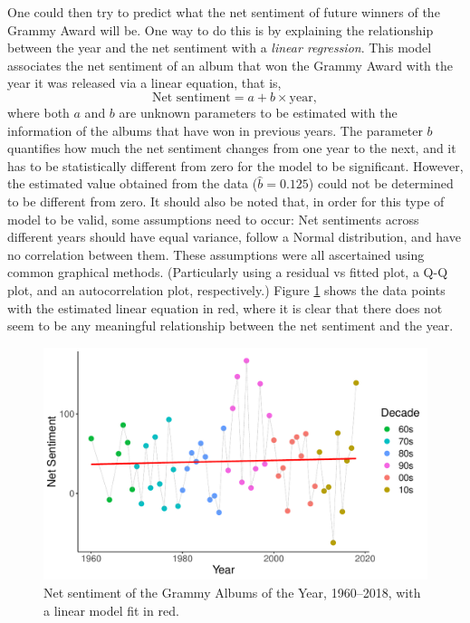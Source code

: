 \documentclass{article}
\begin{document}
One could then try to predict what the net sentiment of future winners of the Grammy Award will be. One way to do this is by explaining the relationship between the year and the net sentiment with a \textit{linear regression}. This model associates the net sentiment of an album that won the Grammy Award with the year it was released via a linear equation, that is,
\begin{equation*}
    \text{Net sentiment} = a + b \times \text{year},
\end{equation*}
where both $a$ and $b$ are unknown parameters to be estimated with the information of the albums that have won in previous years. The parameter $b$ quantifies how much the net sentiment changes from one year to the next, and it has to be statistically different from zero for the model to be significant. However, the estimated value obtained from the data ($\hat{b} = 0.125$) could not be determined to be different from zero. It should also be noted that, in order for this type of model to be valid, some assumptions need to occur: Net sentiments across different years should have equal variance, follow a Normal distribution, and have no correlation between them. These assumptions were all ascertained using common graphical methods. (Particularly using a residual vs fitted plot, a Q-Q plot, and an autocorrelation plot, respectively.) Figure \ref{fig:sentiment_lm} shows the data points with the estimated linear equation in red, where it is clear that there does not seem to be any meaningful relationship between the net sentiment and the year.


\begin{figure}[h]
    \centering
    \includegraphics[scale=0.5]{Plots/graph_sentiment_linear_trend.pdf}
    \caption{Net sentiment of the Grammy Albums of the Year, 1960--2018, with a linear model fit in red.}
    \label{fig:sentiment_lm}
\end{figure}
\end{document}
